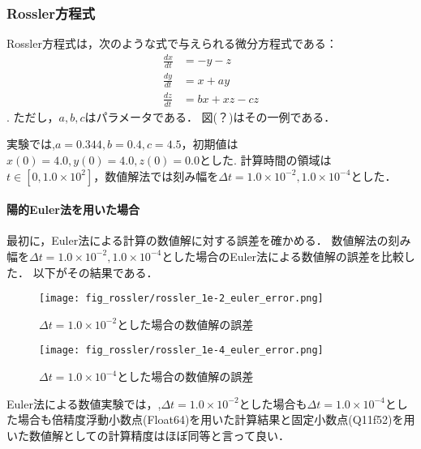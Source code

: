 \subsubsection{Rossler方程式}
Rossler方程式は，次のような式で与えられる微分方程式である：
\begin{align}
    \frac{dx}{dt} &= -y-z \\
    \frac{dy}{dt} &= x+ay \\
    \frac{dz}{dt} &= bx + xz - cz
\end{align}.
ただし，$a,b,c$はパラメータである．
図(？)はその一例である．
\begin{comment}
\begin{figure}
    \centering
    \begin{minipage}[b]{0.49\columnwidth}
        \centering
        \texttt{[image: rossler.png]}
        \caption{Rossler方程式の時間発展の様子}
        \label{fig:rossler1}
    \end{minipage}
    \begin{minipage}[b]{0.49\columnwidth}
        \centering
        \texttt{[image: rossler2.png]}
        \caption{Rossler方程式の時間発展の様子}
        \label{fig:rossler2}
    \end{minipage}
\end{figure}
\end{comment}
実験では,$a=0.344, b=0.4, c=4.5$，初期値は$x(0) = 4.0, y(0) = 4.0, z(0) = 0.0$とした.
計算時間の領域は$t \in [0,1.0 \times 10^2]$，数値解法では刻み幅を$\Delta t =  1.0 \times 10^{-2},1.0 \times 10^{-4}$とした．
\paragraph*{陽的Euler法を用いた場合}
最初に，Euler法による計算の数値解に対する誤差を確かめる．
数値解法の刻み幅を$\Delta t = 1.0 \times 10^{-2},1.0 \times 10^{-4}$とした場合のEuler法による数値解の誤差を比較した．
以下がその結果である．
\begin{figure}[H]
    \centering
    \begin{minipage}[b]{0.49\columnwidth}
        \centering
        \texttt{[image: fig\_rossler/rossler\_1e-2\_euler\_error.png]}
        \caption{$\Delta t = 1.0 \times 10^{-2}$とした場合の数値解の誤差}
        \label{fig:rossler_1e-2_euler_error}
    \end{minipage}
    \begin{minipage}[b]{0.49\columnwidth}
        \centering
        \texttt{[image: fig\_rossler/rossler\_1e-4\_euler\_error.png]}
        \caption{$\Delta t = 1.0 \times 10^{-4}$とした場合の数値解の誤差}
        \label{fig:rossler_1e-4_euler_error}
    \end{minipage}
\end{figure} 
Euler法による数値実験では，,$\Delta t = 1.0 \times 10^{-2}$とした場合も$\Delta t = 1.0 \times 10^{-4}$とした場合も倍精度浮動小数点(Float64)を用いた計算結果と固定小数点(Q11f52)を用いた数値解としての計算精度はほぼ同等と言って良い．


